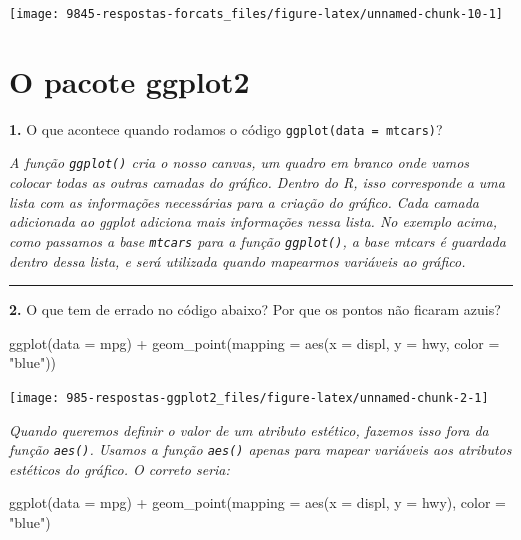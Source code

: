 \documentclass[
]{book}
\newenvironment{Shaded}{\begin{snugshade}}{\end{snugshade}}
\newcommand{\AttributeTok}[1]{\textcolor[rgb]{0.77,0.63,0.00}{#1}}
\newcommand{\FunctionTok}[1]{\textcolor[rgb]{0.00,0.00,0.00}{#1}}
\newcommand{\NormalTok}[1]{#1}
\newcommand{\SpecialCharTok}[1]{\textcolor[rgb]{0.00,0.00,0.00}{#1}}
\newcommand{\StringTok}[1]{\textcolor[rgb]{0.31,0.60,0.02}{#1}}
\begin{document}
\begin{center}\texttt{[image: 9845-respostas-forcats\_files/figure-latex/unnamed-chunk-10-1]} \end{center}

\hypertarget{o-pacote-ggplot2-1}{%
\section{O pacote ggplot2}\label{o-pacote-ggplot2-1}}

\textbf{1.} O que acontece quando rodamos o código \texttt{ggplot(data\ =\ mtcars)}?

\emph{A função \texttt{ggplot()} cria o nosso canvas, um quadro em branco onde vamos colocar todas as outras camadas do gráfico. Dentro do R, isso corresponde a uma lista com as informações necessárias para a criação do gráfico. Cada camada adicionada ao ggplot adiciona mais informações nessa lista. No exemplo acima, como passamos a base \texttt{mtcars} para a função \texttt{ggplot()}, a base mtcars é guardada dentro dessa lista, e será utilizada quando mapearmos variáveis ao gráfico.}

\begin{center}\rule{0.5\linewidth}{0.5pt}\end{center}

\textbf{2.} O que tem de errado no código abaixo? Por que os pontos não ficaram azuis?

\begin{Shaded}
\begin{Highlighting}[]
\FunctionTok{ggplot}\NormalTok{(}\AttributeTok{data =}\NormalTok{ mpg) }\SpecialCharTok{+} 
  \FunctionTok{geom\_point}\NormalTok{(}\AttributeTok{mapping =} \FunctionTok{aes}\NormalTok{(}\AttributeTok{x =}\NormalTok{ displ, }\AttributeTok{y =}\NormalTok{ hwy, }\AttributeTok{color =} \StringTok{"blue"}\NormalTok{))}
\end{Highlighting}
\end{Shaded}

\begin{center}\texttt{[image: 985-respostas-ggplot2\_files/figure-latex/unnamed-chunk-2-1]} \end{center}

\emph{Quando queremos definir o valor de um atributo estético, fazemos isso fora da função \texttt{aes()}. Usamos a função \texttt{aes()} apenas para mapear variáveis aos atributos estéticos do gráfico. O correto seria:}

\begin{Shaded}
\begin{Highlighting}[]
\FunctionTok{ggplot}\NormalTok{(}\AttributeTok{data =}\NormalTok{ mpg) }\SpecialCharTok{+} 
  \FunctionTok{geom\_point}\NormalTok{(}\AttributeTok{mapping =} \FunctionTok{aes}\NormalTok{(}\AttributeTok{x =}\NormalTok{ displ, }\AttributeTok{y =}\NormalTok{ hwy), }\AttributeTok{color =} \StringTok{"blue"}\NormalTok{)}
\end{Highlighting}
\end{Shaded}
\end{document}
